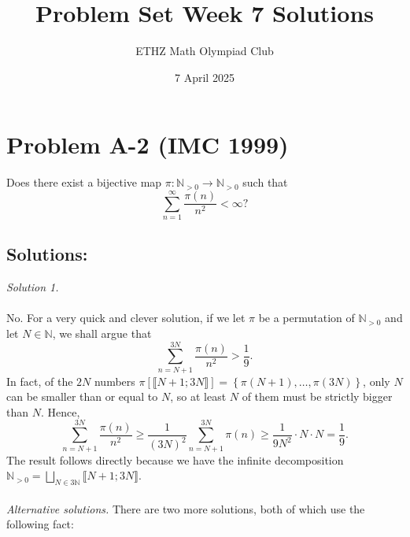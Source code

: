 \documentclass[11pt, a4paper, oneside]{article}
\title{Problem Set Week 7 Solutions}
\author{ETHZ Math Olympiad Club}
\date{7 April 2025}
\newcommand{\problem}[1][]{\section{#1} \hfill \par}
\newcommand{\solution}[1][]{\subsection*{#1}\hfill \par}
\theoremstyle{remark}
\theoremstyle{lemma}
\begin{document}
\maketitle
\problem[Problem A-2 (IMC 1999)]
Does there exist a bijective map \(\pi \colon \mathbb{N}_{>0} \to \mathbb{N}_{>0}\) such that
\[
\sum_{n=1}^{\infty} \frac{\pi(n)}{n^2} < \infty?
\]

\solution[Solutions:]
\textit{Solution 1.}
\\\\
No. For a very quick and clever solution, if we let \(\pi\) be a permutation of \(\mathbb{N}_{>0}\) and let \(N \in \mathbb{N}\), we shall argue that
\[
\sum_{n=N+1}^{3N} \frac{\pi(n)}{n^2} > \frac{1}{9}.
\]
In fact, of the \(2N\) numbers \(\pi\left[\llbracket N+1;3N\rrbracket\right]=\left\{\pi(N+1), \ldots, \pi(3N)\right\}\), only \(N\) can be smaller than or equal to \(N\), so at least \(N\) of them must be strictly bigger than \(N\). Hence,
\[
\sum_{n=N+1}^{3N} \frac{\pi(n)}{n^2} \geq \frac{1}{(3N)^2} \sum_{n=N+1}^{3N} \pi(n) \geq \frac{1}{9N^2} \cdot N \cdot N = \frac{1}{9}.
\]
The result follows directly because we have the infinite decomposition \(\mathbb{N}_{>0}= \bigsqcup_{N\in 3\mathbb{N}} \llbracket N+1;3N \rrbracket\).
\\\\
\textit{Alternative solutions.} There are two more solutions, both of which use the following fact:
\\\\
\end{document}
